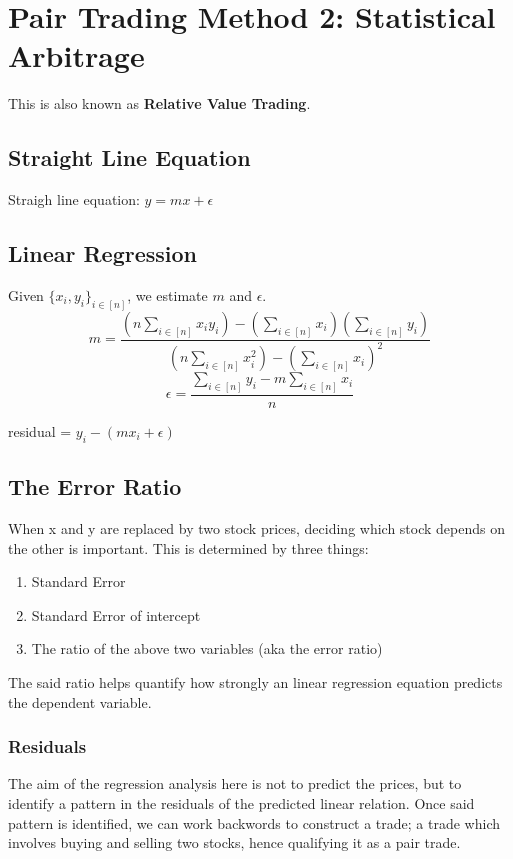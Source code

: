 \documentclass{article}
\begin{document}
\section{Pair Trading Method 2: Statistical Arbitrage}
This is also known as \textbf{Relative Value Trading}.
\subsection{Straight Line Equation}
Straigh line equation: $y = mx + \epsilon$
\subsection{Linear Regression}
Given $\{x_i,y_i\}_{i\in[n]}$, we estimate $m$ and $\epsilon$.\\
\begin{equation}
    m = \frac{(n\sum_{i\in [n]}{x_iy_i}) - (\sum_{i\in [n]}{x_i})(\sum_{i\in [n]}{y_i})}{(n\sum_{i\in [n]}{x_i^2}) - (\sum_{i \in [n]}{x_i})^2}
\end{equation}
\begin{equation}
    \epsilon = \frac{\sum_{i \in [n]}{y_i} - m\sum_{i\in [n]}{x_i}}{n}
\end{equation}
\begin{center}
    residual = $y_i - (mx_i + \epsilon)$
\end{center}
\subsection{The Error Ratio}
When x and y are replaced by two stock prices, deciding which stock depends on the
other is important. This is determined by three things:
\begin{enumerate}
    \item Standard Error
    \item Standard Error of intercept
    \item The ratio of the above two variables (aka the error ratio)
\end{enumerate}
The said ratio helps quantify how strongly an linear regression equation predicts
the dependent variable.
\subsubsection{Residuals}
The aim of the regression analysis here is not to predict the prices, but to
identify a pattern in the residuals of the predicted linear relation. Once said
pattern is identified, we can work backwords to construct a trade; a trade which
involves buying and selling two stocks, hence qualifying it as a pair trade.
\end{document}
